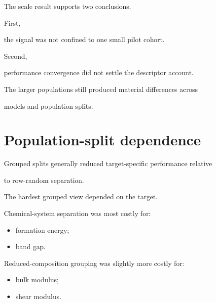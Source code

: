 \documentclass[11pt,a4paper,oneside]{report}
\begin{document}
The scale result supports two conclusions.



First,

the signal was not confined to one small pilot cohort.



Second,

performance convergence did not settle the descriptor account.



The larger populations still produced material differences across

models and population splits.





\section{Population-split dependence}



Grouped splits generally reduced target-specific performance relative

to row-random separation.



The hardest grouped view depended on the target.



Chemical-system separation was most costly for:



\begin{itemize}



\item

formation energy;



\item

band gap.



\end{itemize}



Reduced-composition grouping was slightly more costly for:



\begin{itemize}



\item

bulk modulus;



\item

shear modulus.



\end{itemize}
\end{document}
